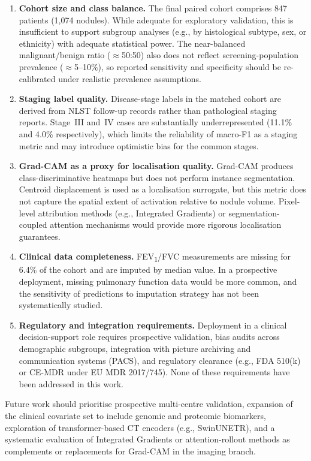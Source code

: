 {\begin{enumerate}
    \item \textbf{Cohort size and class balance.}
    The final paired cohort comprises 847 patients (1{,}074 nodules). While adequate
    for exploratory validation, this is insufficient to support subgroup analyses
    (e.g., by histological subtype, sex, or ethnicity) with adequate statistical power.
    The near-balanced malignant/benign ratio ($\approx$50:50) also does not reflect
    screening-population prevalence ($\approx$5--10\%), so reported sensitivity and
    specificity should be re-calibrated under realistic prevalence assumptions.

    \item \textbf{Staging label quality.}
    Disease-stage labels in the matched cohort are derived from NLST follow-up records
    rather than pathological staging reports. Stage~III and~IV cases are substantially
    underrepresented (11.1\% and 4.0\% respectively), which limits the reliability of
    macro-F1 as a staging metric and may introduce optimistic bias for the common stages.

    \item \textbf{Grad-CAM as a proxy for localisation quality.}
    Grad-CAM produces class-discriminative heatmaps but does not perform instance
    segmentation. Centroid displacement is used as a localisation surrogate, but this
    metric does not capture the spatial extent of activation relative to nodule volume.
    Pixel-level attribution methods (e.g., Integrated Gradients) or segmentation-coupled
    attention mechanisms would provide more rigorous localisation guarantees.

    \item \textbf{Clinical data completeness.}
    FEV\textsubscript{1}/FVC measurements are missing for 6.4\% of the cohort and
    are imputed by median value. In a prospective deployment, missing pulmonary function
    data would be more common, and the sensitivity of predictions to imputation strategy
    has not been systematically studied.

    \item \textbf{Regulatory and integration requirements.}
    Deployment in a clinical decision-support role requires prospective validation,
    bias audits across demographic subgroups, integration with picture archiving and
    communication systems (PACS), and regulatory clearance (e.g., FDA 510(k) or CE-MDR
    under EU MDR 2017/745). None of these requirements have been addressed in this work.

\end{enumerate}

Future work should prioritise prospective multi-centre validation, expansion of the
clinical covariate set to include genomic and proteomic biomarkers, exploration of
transformer-based CT encoders (e.g., SwinUNETR), and a systematic evaluation of
Integrated Gradients or attention-rollout methods as complements or replacements for
Grad-CAM in the imaging branch.

} %